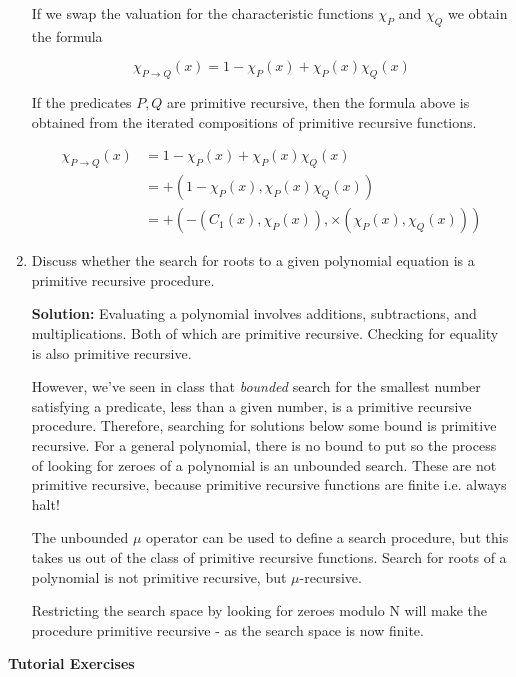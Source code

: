 \documentclass[11pt]{report}
\begin{document}
\begin{enumerate}
	If we swap the valuation for the characteristic functions $\chi_{P}$ and $\chi_{Q}$ we obtain the formula 

	$$\chi_{P \rightarrow Q}(x) = 1 - \chi_{P}(x) + \chi_{P}(x)\chi_{Q}(x)$$

	If the predicates $P,Q$ are primitive recursive, then the formula above is obtained from the iterated compositions of primitive recursive functions. 

	\begin{align*}
		\chi_{P \rightarrow Q}(x) &= 1 - \chi_{P}(x) + \chi_{P}(x)\chi_{Q}(x) \\
		&= +(1 - \chi_{P}(x), \chi_{P}(x)\chi_{Q}(x))\\
		&= +(-(C_{1}(x), \chi_{P}(x)), \times(\chi_{P}(x),\chi_{Q}(x)))
	\end{align*}

	\item Discuss whether the search for roots to a given polynomial equation is a primitive recursive procedure.
	

	{\bf Solution:} Evaluating a polynomial involves additions, subtractions, and multiplications. Both of which are primitive recursive. Checking for equality is also primitive recursive. 
	
	However, we've seen in class that \emph{bounded} search for the smallest number satisfying a predicate, less than a given number, is a primitive recursive procedure. Therefore, searching for solutions below some bound is primitive recursive. For a general polynomial, there is no bound to put so the process of looking for zeroes of a polynomial is an unbounded search. These are not primitive recursive, because primitive recursive functions are finite i.e. always halt! 	
	
	The unbounded $\mu$ operator can be used to define a search procedure, but this takes us out of the class of primitive recursive functions. Search for roots of a polynomial is not primitive recursive, but $\mu$-recursive. 

	Restricting the search space by looking for zeroes modulo N will make the procedure primitive recursive - as the search space is now finite. 


\end{enumerate}	

\newpage
{\bf Tutorial Exercises}
\end{document}
